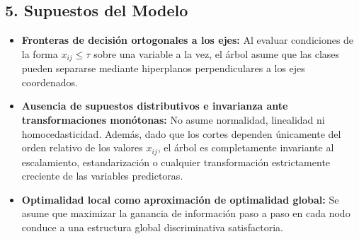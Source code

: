 \documentclass[11pt, a4paper]{article}
\begin{document}
\subsection*{5. Supuestos del Modelo}
\begin{itemize}
    \item \textbf{Fronteras de decisión ortogonales a los ejes:} Al evaluar condiciones de la forma $x_{ij} \le \tau$ sobre una variable a la vez, el árbol asume que las clases pueden separarse mediante hiperplanos perpendiculares a los ejes coordenados.
    \item \textbf{Ausencia de supuestos distributivos e invarianza ante transformaciones monótonas:} No asume normalidad, linealidad ni homocedasticidad. Además, dado que los cortes dependen únicamente del orden relativo de los valores $x_{ij}$, el árbol es completamente invariante al escalamiento, estandarización o cualquier transformación estrictamente creciente de las variables predictoras.
    \item \textbf{Optimalidad local como aproximación de optimalidad global:} Se asume que maximizar la ganancia de información paso a paso en cada nodo conduce a una estructura global discriminativa satisfactoria.
\end{itemize}
\end{document}
